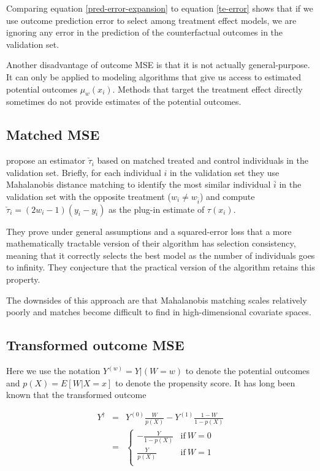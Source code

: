Comparing equation \ref{pred-error-expansion} to equation \ref{te-error} shows that if we use outcome prediction error to select among treatment effect models, we are ignoring any error in the prediction of the counterfactual outcomes in the validation set. 

Another disadvantage of outcome MSE is that it is not actually general-purpose. It can only be applied to modeling algorithms that give us access to estimated potential outcomes $\mu_w(x_i)$. Methods that target the treatment effect directly sometimes do not provide estimates of the potential outcomes.

\subsection{Matched MSE}
\label{match-mse}

\citet{Rolling:2013kz} propose an estimator $\check \tau_i$ based on matched treated and control individuals in the validation set. Briefly, for each individual $i$ in the validation set they use Mahalanobis distance matching to identify the most similar individual $\bar{i}$ in the validation set with the opposite treatment ($w_i \ne w_{\bar i}$) and compute $\check \tau_i = (2w_i -1)(y_i - y_{\bar i})$ as the plug-in estimate of $\tau(x_i)$. 

They prove under general assumptions and a squared-error loss that a more mathematically tractable version of their algorithm has selection consistency, meaning that it correctly selects the best model as the number of individuals goes to infinity. They conjecture that the practical version of the algorithm retains this property.

The downsides of this approach are that Mahalanobis matching scales relatively poorly and matches become difficult to find in high-dimensional covariate spaces.

\subsection{Transformed outcome MSE}
\label{trans-mse}

Here we use the notation $Y^{(w)} = Y|(W=w)$ to denote the potential outcomes and $p(X) = E[W|X=x]$ to denote the propensity score. It has long been known that the transformed outcome 

\begin{equation}
	\begin{array}{rcl}
	Y^{\dagger}  & = & Y^{(0)} \frac{W}{p(X)} - Y^{(1)} \frac{1-W}{1-p(X)} \\
	& = &
	\begin{cases}
		-\frac{Y}{1-p(X)} & \text{if} \ W=0 \\
		\frac{Y}{p(X)} & \text{if} \ W=1\\
	\end{cases} \\
	\end{array}
\end{equation}

